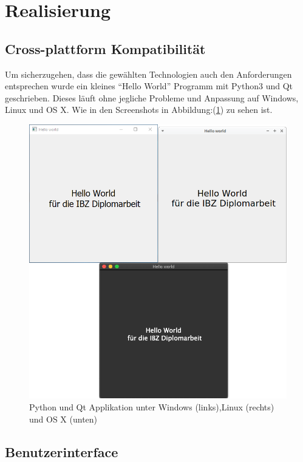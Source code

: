 \cleardoublepage
\section{Realisierung}
\label{sec:orgb833f22}
\subsection{Cross-plattform Kompatibilität}
\label{sec:orgcad6880}

Um sicherzugehen, dass die gewählten Technologien auch den Anforderungen
entsprechen wurde ein kleines "`Hello World"' Programm mit Python3 und Qt
geschrieben. Dieses läuft ohne jegliche Probleme und Anpassung auf Windows,
Linux und OS X. Wie in den Screenshots in Abbildung:(\ref{fig:org8f81d9f}) zu sehen
ist.

\begin{figure}[htbp]
\centering
\includegraphics[width=.9\linewidth]{pictures/hello_world.png}
\caption{\label{fig:org8f81d9f}
Python und Qt Applikation unter Windows (links),\newline Linux (rechts) und OS X (unten)}
\end{figure}

\subsection{Benutzerinterface}
\label{sec:org184310c}
